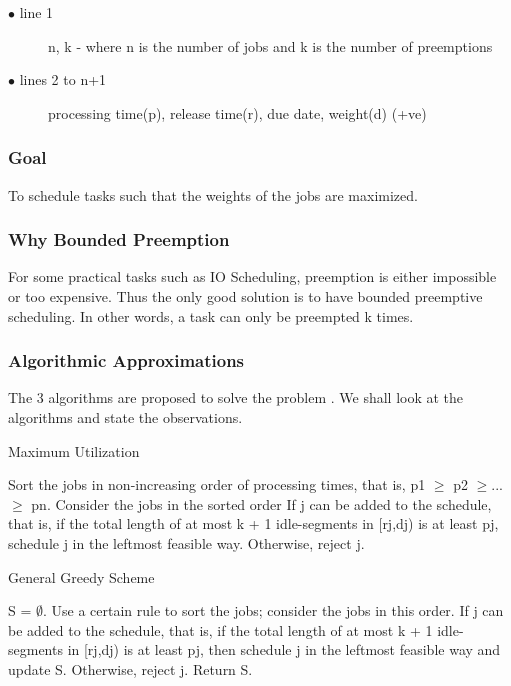 \documentclass[11pt]{article}
\begin{document}
{		\begin{description}
			\item[$\bullet$ line 1]  n, k - where n is the number of jobs and k is the number of preemptions
			\item[$\bullet$ lines 2 to n+1] processing time(p), release time(r), due date, weight(d) (+ve)
		\end{description}
		
		\subsubsection{Goal}
		To schedule tasks such that the weights of the jobs are maximized.
		
		\subsubsection{Why Bounded Preemption}
		For some practical tasks such as IO Scheduling, preemption is either impossible or too expensive. Thus the only good solution is to have bounded preemptive scheduling. In other words, a task can only be preempted k times.
		
		
		
		\subsubsection{Algorithmic Approximations}
		The 3 algorithms are proposed to solve the problem \citet{doi:10.1137/1.9781611974317.11}. We shall look at the algorithms and state the observations.
		\setlength{\textfloatsep}{0pt}%
		\begin{algorithm}
			\caption{Maximum Utilization}
			\begin{algorithmic}[1]
				\STATE Sort the jobs in non-increasing order of processing times, that is, p1 $\geq$ p2 $\geq$...$\geq$ pn.
				\STATE Consider the jobs in the sorted order
				\STATE If j can be added to the schedule, that is, if the total length of at most k + 1 idle-segments in [rj,dj) is at least pj, schedule j in the leftmost feasible way. Otherwise, reject j.
				\ENDFOR
			\end{algorithmic}
		\end{algorithm}
		\setlength{\textfloatsep}{0pt}%
		\begin{algorithm}
			\caption{General Greedy Scheme}
			\begin{algorithmic}[1]
				\STATE S = $\emptyset$.
				\STATE Use a certain rule to sort the jobs; consider the jobs in this order.
				\FOR{the current job j}
				\STATE If j can be added to the schedule, that is, if
				the total length of at most k + 1 idle-segments in [rj,dj) is at least pj, then schedule j in the leftmost feasible way and update S. Otherwise, reject j.
				\ENDFOR
				\STATE Return S.
			\end{algorithmic}
		\end{algorithm}
		
}
\end{document}
